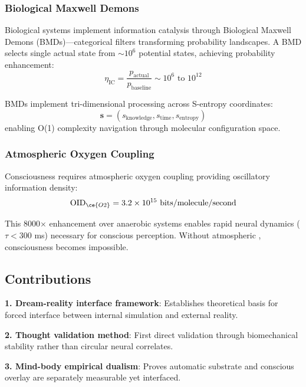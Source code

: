 \documentclass[12pt,twocolumn]{article}
\theoremstyle{remark}
\begin{document}
\subsubsection{Biological Maxwell Demons}

Biological systems implement information catalysis through Biological Maxwell Demons (BMDs)---categorical filters transforming probability landscapes. A BMD selects single actual state from $\sim 10^6$ potential states, achieving probability enhancement:
\begin{equation}
\eta_{\text{IC}} = \frac{p_{\text{actual}}}{p_{\text{baseline}}} \sim 10^{6} \text{ to } 10^{12}
\end{equation}

BMDs implement tri-dimensional processing across S-entropy coordinates:
\begin{equation}
\mathbf{s} = (s_{\text{knowledge}}, s_{\text{time}}, s_{\text{entropy}})
\end{equation}
enabling O(1) complexity navigation through molecular configuration space.

\subsubsection{Atmospheric Oxygen Coupling}

Consciousness requires atmospheric oxygen coupling providing oscillatory information density:
\begin{equation}
\text{OID}_{\ce{O2}} = 3.2 \times 10^{15} \text{ bits/molecule/second}
\end{equation}

This 8000$\times$ enhancement over anaerobic systems enables rapid neural dynamics ($\tau < 300$ ms) necessary for conscious perception. Without atmospheric , consciousness becomes impossible.

\subsection{Contributions}

\textbf{1. Dream-reality interface framework}: Establishes theoretical basis for forced interface between internal simulation and external reality.

\textbf{2. Thought validation method}: First direct validation through biomechanical stability rather than circular neural correlates.

\textbf{3. Mind-body empirical dualism}: Proves automatic substrate and conscious overlay are separately measurable yet interfaced.
\end{document}
